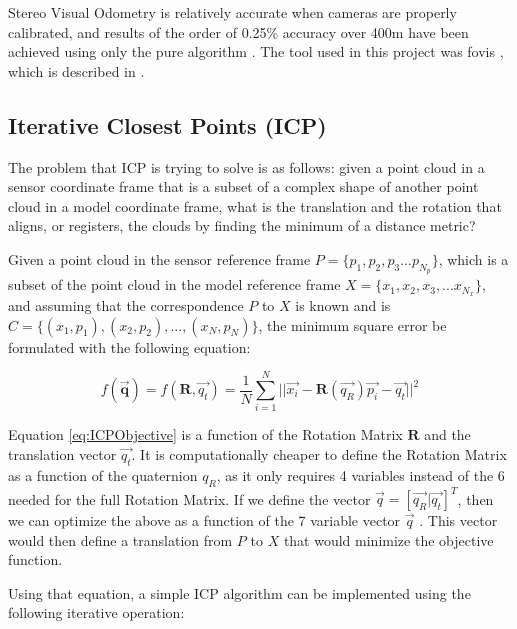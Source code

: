 \documentclass[12pt]{article}
\begin{document}
Stereo Visual Odometry is relatively accurate when cameras are properly calibrated, and results of the order of 0.25\% accuracy over 400m have been achieved using only the pure algorithm \cite{StereoVis1}. The tool used in this project was fovis \cite{fovis}, which is described in \cite{VisualOdometry}.
	
	\subsection{Iterative Closest Points (ICP)}
	\label{subs:ICP}
The problem that ICP is trying to solve is as follows: given a point cloud in a sensor coordinate frame that is a subset of a complex shape of another point cloud in a model coordinate frame, what is the translation and the rotation that aligns, or registers, the clouds by finding the minimum of a distance metric?
	
Given a point cloud in the sensor reference frame $P = \{p_1, p_2, p_3 ... p_{N_p}\}$, which is a subset of the point cloud in the model reference frame $X = \{x_1, x_2, x_3, ... x_{N_x}\}$, and assuming that the correspondence $P$ to $X$ is known and is $C = \{(x_1,p_1), (x_2,p_2), ... , (x_N, p_N)\}$, the minimum square error be formulated with the following equation:
	
\begin{equation}
f(\mathbf{\overrightarrow{q}}) = f(\mathbf{R},\overrightarrow{q_t}) = \frac{1}{N}\sum_{i=1}^{N}{||\overrightarrow{x_i}-\mathbf{R}(\overrightarrow{q_R})\overrightarrow{p_i}-\overrightarrow{q_t}||^{2}} 	
\label{eq:ICPObjective}
\end{equation}		
	
Equation \ref{eq:ICPObjective} is a function of the Rotation Matrix $\mathbf{R}$ and the translation vector $\overrightarrow{q_t}$. It is computationally cheaper to define the Rotation Matrix as a function of the quaternion $q_R$, as it only requires 4 variables instead of the 6 needed for the full Rotation Matrix. If we define the vector $\overrightarrow{q} = [\overrightarrow{q_R} | \overrightarrow{q_t}]^T$, then we can optimize the above as a function of the 7 variable vector $\overrightarrow{q}$ \cite{AMethodRegistration}. This vector would then define a translation from $P$ to $X$ that would minimize the objective function.
	
Using that equation, a simple ICP algorithm can be implemented using the following iterative operation:
\end{document}
